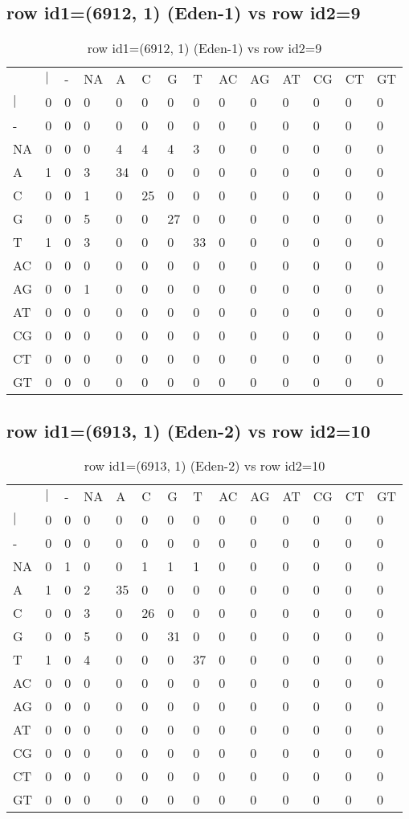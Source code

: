 \subsection{row id1=(6912, 1) (Eden-1) vs row id2=9}
\begin{center}
\begin{longtable}{|l|l|l|l|l|l|l|l|l|l|l|l|l|l|}
\caption{row id1=(6912, 1) (Eden-1) vs row id2=9} \label{table_dm90}\\
\hline
\\
\hline
&$|$&-&NA&A&C&G&T&AC&AG&AT&CG&CT&GT\\
$|$&0&0&0&0&0&0&0&0&0&0&0&0&0\\
-&0&0&0&0&0&0&0&0&0&0&0&0&0\\
NA&0&0&0&4&4&4&3&0&0&0&0&0&0\\
A&1&0&3&34&0&0&0&0&0&0&0&0&0\\
C&0&0&1&0&25&0&0&0&0&0&0&0&0\\
G&0&0&5&0&0&27&0&0&0&0&0&0&0\\
T&1&0&3&0&0&0&33&0&0&0&0&0&0\\
AC&0&0&0&0&0&0&0&0&0&0&0&0&0\\
AG&0&0&1&0&0&0&0&0&0&0&0&0&0\\
AT&0&0&0&0&0&0&0&0&0&0&0&0&0\\
CG&0&0&0&0&0&0&0&0&0&0&0&0&0\\
CT&0&0&0&0&0&0&0&0&0&0&0&0&0\\
GT&0&0&0&0&0&0&0&0&0&0&0&0&0\\
\hline
\end{longtable}
\end{center}

\subsection{row id1=(6913, 1) (Eden-2) vs row id2=10}
\begin{center}
\begin{longtable}{|l|l|l|l|l|l|l|l|l|l|l|l|l|l|}
\caption{row id1=(6913, 1) (Eden-2) vs row id2=10} \label{table_dm92}\\
\hline
\\
\hline
&$|$&-&NA&A&C&G&T&AC&AG&AT&CG&CT&GT\\
$|$&0&0&0&0&0&0&0&0&0&0&0&0&0\\
-&0&0&0&0&0&0&0&0&0&0&0&0&0\\
NA&0&1&0&0&1&1&1&0&0&0&0&0&0\\
A&1&0&2&35&0&0&0&0&0&0&0&0&0\\
C&0&0&3&0&26&0&0&0&0&0&0&0&0\\
G&0&0&5&0&0&31&0&0&0&0&0&0&0\\
T&1&0&4&0&0&0&37&0&0&0&0&0&0\\
AC&0&0&0&0&0&0&0&0&0&0&0&0&0\\
AG&0&0&0&0&0&0&0&0&0&0&0&0&0\\
AT&0&0&0&0&0&0&0&0&0&0&0&0&0\\
CG&0&0&0&0&0&0&0&0&0&0&0&0&0\\
CT&0&0&0&0&0&0&0&0&0&0&0&0&0\\
GT&0&0&0&0&0&0&0&0&0&0&0&0&0\\
\hline
\end{longtable}
\end{center}


